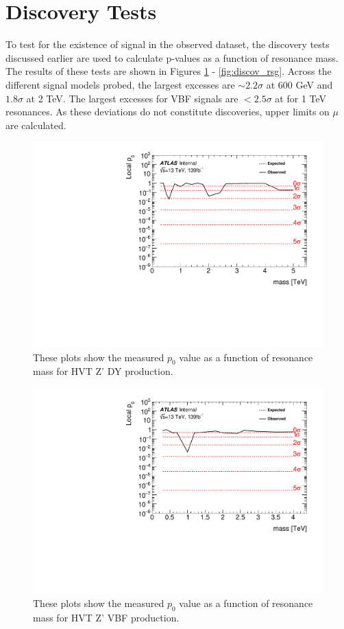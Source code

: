 \section{Discovery Tests}
To test for the existence of signal in the observed dataset, the discovery tests discussed earlier are used to calculate p-values as a function of resonance mass. The results of these tests are shown in Figures \ref{fig:discov_hvtww} - \ref{fig:discov_rsg}. Across the different signal models probed, the largest excesses are $\sim 2.2\sigma$ at 600 GeV and $1.8\sigma$ at 2 TeV. The largest excesses for VBF signals are $< 2.5\sigma$ at for 1 TeV resonances. As these deviations do not constitute discoveries, upper limits on $\mu$ are calculated.
 \begin{figure}[h!]
  \centering
  \includegraphics[width=\hsize]{figures/results/pvalues/fixed_pvalues/hvtww_pvalue.pdf}
 \caption{These plots show the measured $p_{0}$ value as a function of resonance mass for HVT Z' DY production.} 
  \label{fig:discov_hvtww}
\end{figure} 
\FloatBarrier

\begin{figure}[h!]
  \centering
  \includegraphics[width=\hsize]{figures/results/pvalues/fixed_pvalues/hvtwwvbf_pvalue.pdf}
 \caption{These plots show the measured $p_{0}$ value as a function of resonance mass for HVT Z' VBF production.} 
  \label{fig:discov_hvtwwvbf}
\end{figure} 
\FloatBarrier


